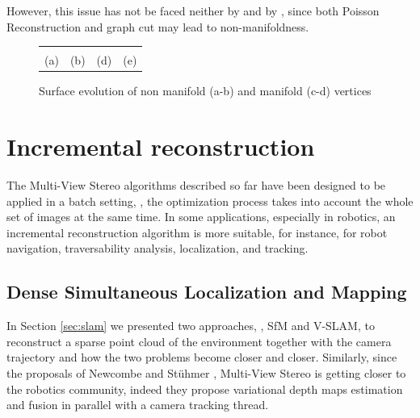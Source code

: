 However, this issue has not be faced neither by \cite{fu10} and by \cite{labatut2007efficient,vu_et_al_2012}, since both Poisson Reconstruction and graph cut may lead to non-manifoldness.




\begin{figure}[tb]
\centering
\setlength{\tabcolsep}{1px}
\begin{tabular}{cccc}
{\def\svgwidth{0.23\textwidth}
  }&
{\def\svgwidth{0.23\textwidth}
  }&
{\def\svgwidth{0.23\textwidth}
  }&
{\def\svgwidth{0.23\textwidth}
  }\\
(a)&(b)&(d)&(e)\\
\end{tabular}
\caption{Surface evolution of non manifold (a-b) and manifold (c-d) vertices}
\label{fig:whymanifold} 
\end{figure}

\section{Incremental reconstruction} 
\label{sec:incr}
The Multi-View Stereo algorithms described so far have been designed to be applied in a batch setting, \ie, the optimization process takes into account the whole set of images at the same time.
In some applications, especially in robotics, an incremental reconstruction algorithm is more suitable, for instance, for robot navigation, traversability analysis, localization, and tracking.
\subsection{Dense Simultaneous Localization and Mapping}
In Section \ref{sec:slam} we presented two approaches, \ie, SfM and V-SLAM, to reconstruct a sparse point cloud of the environment together with the camera trajectory and how the two problems become closer and closer.
Similarly, since the proposals of Newcombe \etal \cite{newcombe2010live,newcombe2011kinectfusion,newcombe2011dtam} and St{\"u}hmer \etal \cite{stuhmer2010real}, Multi-View Stereo is getting closer to the robotics community, indeed they propose variational depth maps estimation and fusion in parallel with a camera tracking thread.

